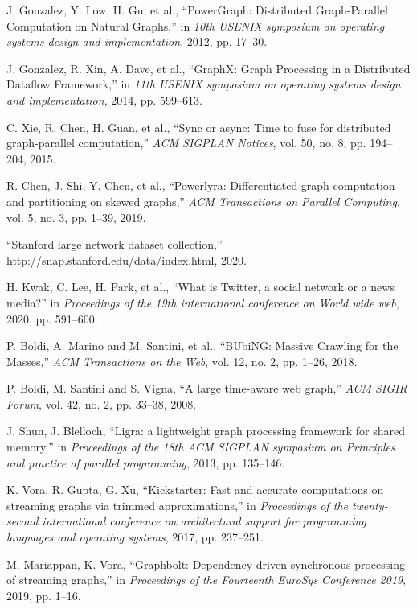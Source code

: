 \documentclass[lettersize,journal]{IEEEtran} %
\begin{document}
\begin{thebibliography}{100}
  J. Gonzalez, Y. Low, H. Gu, et al., ``{PowerGraph}: Distributed {Graph-Parallel} Computation on Natural Graphs,'' in \textit{10th USENIX symposium on operating systems design and implementation}, 2012, pp. 17--30.
  
  J. Gonzalez, R. Xin, A. Dave, et al., ``{GraphX}: Graph Processing in a Distributed Dataflow Framework,'' in \textit{11th USENIX symposium on operating systems design and implementation}, 2014, pp. 599--613.
  
  C. Xie, R. Chen, H. Guan, et al., ``Sync or async: Time to fuse for distributed graph-parallel computation,'' \textit{ACM SIGPLAN Notices}, vol. 50, no. 8, pp. 194--204, 2015.
  
  R. Chen, J. Shi, Y. Chen, et al., ``Powerlyra: Differentiated graph computation and partitioning on skewed graphs,'' \textit{ACM Transactions on Parallel Computing}, vol. 5, no. 3, pp. 1--39, 2019.
  
  ``Stanford large network dataset collection,'' http://snap.stanford.edu/data/index.html, 2020.
  
  H. Kwak, C. Lee, H. Park, et al., ``What is Twitter, a social network or a news media?'' in \textit{Proceedings of the 19th international conference on World wide web}, 2020, pp. 591--600.
  
  P. Boldi, A. Marino and M. Santini, et al.,  ``BUbiNG: Massive Crawling for the Masses,''  \textit{ACM Transactions on the Web}, vol. 12, no. 2, pp. 1--26, 2018.
  
  P. Boldi, M. Santini and S. Vigna,  ``A large time-aware web graph,''  \textit{ACM SIGIR Forum}, vol. 42, no. 2, pp. 33--38, 2008.
  
  J. Shun, J. Blelloch, ``Ligra: a lightweight graph processing framework for shared memory,'' in \textit{Proceedings of the 18th ACM SIGPLAN symposium on Principles and practice of parallel programming}, 2013, pp. 135--146.
  
  K. Vora, R. Gupta, G. Xu, ``Kickstarter: Fast and accurate computations on streaming graphs via trimmed approximations,'' in \textit{Proceedings of the twenty-second international conference on architectural support for programming languages and operating systems}, 2017, pp. 237--251.
  
  M. Mariappan, K. Vora, ``Graphbolt: Dependency-driven synchronous processing of streaming graphs,'' in \textit{Proceedings of the Fourteenth EuroSys Conference 2019}, 2019, pp. 1--16.
  

\end{thebibliography}
\end{document}
